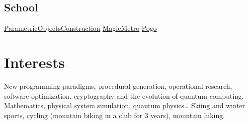 \documentclass[letterpaper,10pt,sans]{moderncv}
\begin{document}
		\subsection{School}
				{\href{https://github.com/pinam45/UTBM\_IN55\_ParametricObjectsConstruction}{ParametricObjectsConstruction}}
				{\href{https://github.com/TiWinDeTea/MagicMetro}{MagicMetro}}
				{\href{https://github.com/pinam45/UTBM_IA41_Pogo}{Pogo}}


	\vspace*{\deletedSpace}
	\printbibliography[title=Publications]{}


	\vspace*{\deletedSpace}
	\section{Interests}
			{New programming paradigms, procedural generation, operational research, software optimization, cryptography and the evolution of quantum computing.}
			{Mathematics, physical system simulation, quantum physics\ldots}
			{Skiing and winter sports, cycling (mountain biking in a club for 3 years), mountain hiking.}
\end{document}
